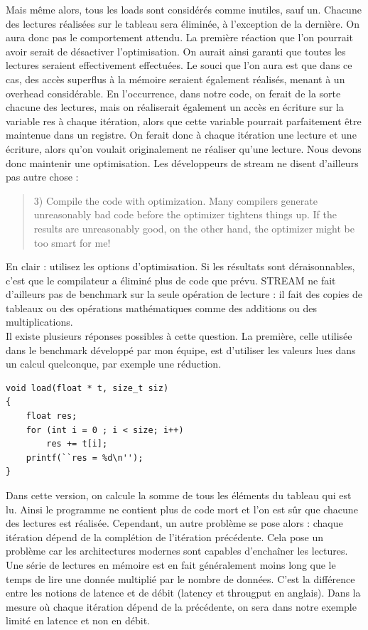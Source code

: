 \documentclass{report}
\begin{document}
Mais même alors, tous les loads sont considérés comme inutiles, sauf un. Chacune des lectures réalisées
sur le tableau sera éliminée, à l'exception de la dernière. On aura donc pas le comportement attendu.
La première réaction que l'on pourrait avoir serait de désactiver l'optimisation. On aurait ainsi 
garanti que toutes les lectures seraient effectivement effectuées. Le souci que l'on aura est que dans
ce cas, des accès superflus à la mémoire seraient également réalisés, menant à un overhead considérable.
En l'occurrence, dans notre code, on ferait de la sorte chacune des lectures, mais on réaliserait 
également un accès en écriture sur la variable res à chaque itération, alors que cette variable pourrait
parfaitement être maintenue dans un registre. On ferait donc à chaque itération une lecture et une
écriture, alors qu'on voulait originalement ne réaliser qu'une lecture. Nous devons donc maintenir
une optimisation. Les développeurs de stream ne disent d'ailleurs pas autre chose :

\begin{quote}
 	3) Compile the code with optimization.  Many compilers generate
        unreasonably bad code before the optimizer tightens things up.  
      If the results are unreasonably good, on the other hand, the
        optimizer might be too smart for me!
\end{quote}

En clair : utilisez les options d'optimisation. Si les résultats sont déraisonnables, c'est que le 
compilateur a éliminé plus de code que prévu. STREAM ne fait d'ailleurs pas de benchmark sur la seule
opération de lecture : il fait des copies de tableaux ou des opérations mathématiques comme des additions
ou des multiplications.
\\Il existe plusieurs réponses possibles à cette question. La première, celle utilisée dans le benchmark
développé par mon équipe, est d'utiliser les valeurs lues dans un calcul quelconque, par exemple une 
réduction.
\begin{lstlisting}
void load(float * t, size_t siz)
{
    float res;
    for (int i = 0 ; i < size; i++)
        res += t[i]; 
    printf(``res = %d\n''); 
}
\end{lstlisting}
Dans cette version, on calcule la somme de tous les éléments du tableau qui est lu. Ainsi le programme
ne contient plus de code mort et l'on est sûr que chacune des lectures est réalisée. Cependant, un autre
problème se pose alors : chaque itération dépend de la complétion de l'itération précédente. Cela pose
un problème car les architectures modernes sont capables d'enchaîner les lectures. Une série de lectures
en mémoire est en fait généralement moins long que le temps de lire une donnée multiplié par le nombre
de données. C'est la différence entre les notions de latence et de débit (latency et througput en 
anglais). Dans la mesure où chaque itération dépend de la précédente, on sera dans notre exemple
limité en latence et non en débit.


\end{document}
